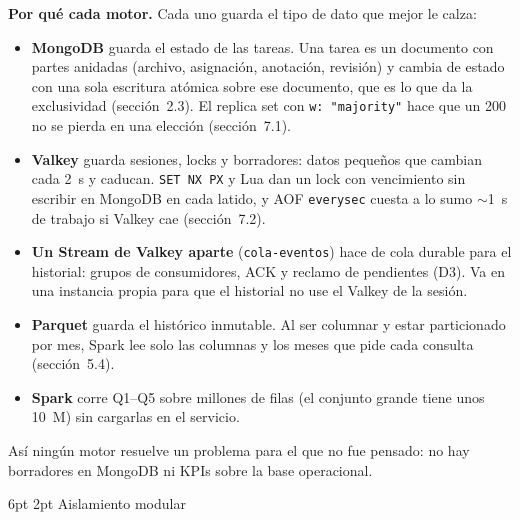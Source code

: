 \documentclass[10pt,letterpaper]{article}
\makeatletter
\renewcommand\subsection{\@startsection{subsection}{2}{\z@}%
  {6pt \@plus 1pt}{2pt}%
  {\normalfont\normalsize\bfseries\color{acc}}}
\makeatother
\begin{document}
\textbf{Por qué cada motor.} Cada uno guarda el tipo de dato que mejor le calza:
\begin{itemize}\setlength{\itemsep}{1pt}
\item \textbf{MongoDB} guarda el estado de las tareas. Una tarea es un documento con partes anidadas (archivo,
asignación, anotación, revisión) y cambia de estado con una sola escritura atómica sobre ese documento,
que es lo que da la exclusividad (sección~2.3). El replica set con \texttt{w: "majority"} hace que un 200 no
se pierda en una elección (sección~7.1).
\item \textbf{Valkey} guarda sesiones, locks y borradores: datos pequeños que cambian cada 2~s y caducan.
\texttt{SET NX PX} y Lua dan un lock con vencimiento sin escribir en MongoDB en cada latido, y AOF
\texttt{everysec} cuesta a lo sumo $\sim$1~s de trabajo si Valkey cae (sección~7.2).
\item \textbf{Un Stream de Valkey aparte} (\texttt{cola-eventos}) hace de cola durable para el historial:
grupos de consumidores, ACK y reclamo de pendientes (D3). Va en una instancia propia para que el historial
no use el Valkey de la sesión.
\item \textbf{Parquet} guarda el histórico inmutable. Al ser columnar y estar particionado por mes, Spark
lee solo las columnas y los meses que pide cada consulta (sección~5.4).
\item \textbf{Spark} corre Q1--Q5 sobre millones de filas (el conjunto grande tiene unos 10~M) sin
cargarlas en el servicio.
\end{itemize}
Así ningún motor resuelve un problema para el que no fue pensado: no hay borradores en MongoDB ni KPIs
sobre la base operacional.

\subsection{Aislamiento modular}
\end{document}

